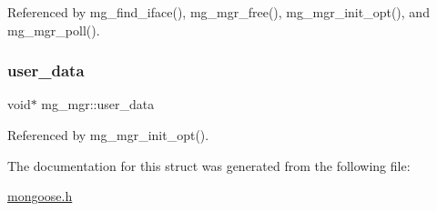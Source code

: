 Referenced by mg\+\_\+find\+\_\+iface(), mg\+\_\+mgr\+\_\+free(), mg\+\_\+mgr\+\_\+init\+\_\+opt(), and mg\+\_\+mgr\+\_\+poll().

\mbox{\label{structmg__mgr_ac2e8ed98ad341f9f58bfd3add2c6bdc6_ac2e8ed98ad341f9f58bfd3add2c6bdc6}} 
\subsubsection{\texorpdfstring{user\+\_\+data}{user\_data}}
{\footnotesize\ttfamily void$\ast$ mg\+\_\+mgr\+::user\+\_\+data}



Referenced by mg\+\_\+mgr\+\_\+init\+\_\+opt().



The documentation for this struct was generated from the following file\+:\begin{DoxyCompactItemize}
\item 
\hyperlink{mongoose_8h}{mongoose.\+h}\end{DoxyCompactItemize}
